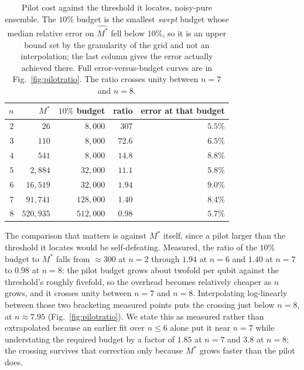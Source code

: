 \begin{table}[htbp]
\centering
\setlength{\tabcolsep}{9pt}
\begin{tabular}{@{}rrrrr@{}}
\toprule
\(n\) & \(M^*\) & \(10\%\) budget & ratio & error at that budget \\
\midrule
\(2\) & \(26\)        & \(8{,}000\)   & \(307\)   & \(5.5\%\) \\
\(3\) & \(110\)       & \(8{,}000\)   & \(72.6\)  & \(6.5\%\) \\
\(4\) & \(541\)       & \(8{,}000\)   & \(14.8\)  & \(8.8\%\) \\
\(5\) & \(2{,}884\)   & \(32{,}000\)  & \(11.1\)  & \(5.8\%\) \\
\(6\) & \(16{,}519\)  & \(32{,}000\)  & \(1.94\)  & \(9.0\%\) \\
\(7\) & \(91{,}741\)  & \(128{,}000\) & \(1.40\)  & \(8.4\%\) \\
\(8\) & \(520{,}935\) & \(512{,}000\) & \(0.98\)  & \(5.7\%\) \\
\bottomrule
\end{tabular}
\caption{Pilot cost against the threshold it locates, noisy-pure ensemble. The \(10\%\) budget is the smallest \emph{swept} budget whose median relative error on \(\widehat{M^*}\) fell below \(10\%\), so it is an upper bound set by the granularity of the grid and not an interpolation; the last column gives the error actually achieved there. Full error-versus-budget curves are in Fig.~\ref{fig:pilotratio}. The ratio crosses unity between \(n = 7\) and \(n = 8\).}
\label{tab:pilot}
\end{table}

The comparison that matters is against \(M^*\) itself, since a pilot larger than the threshold it
locates would be self-defeating. Measured, the ratio of the \(10\%\) budget to \(M^*\) falls from
\(\approx\!300\) at \(n = 2\) through \(1.94\) at \(n = 6\) and \(1.40\) at \(n = 7\) to
\(0.98\) at \(n = 8\): the pilot budget grows about twofold per qubit against the threshold's
roughly fivefold, so the overhead becomes relatively cheaper as \(n\) grows, and it crosses unity
between \(n = 7\) and \(n = 8\). Interpolating log-linearly between those two bracketing measured
points puts the crossing just below \(n = 8\), at \(n \approx 7.95\)
(Fig.~\ref{fig:pilotratio}). We state this as
measured rather than extrapolated because an earlier fit over \(n \le 6\) alone put it near
\(n = 7\) while understating the required budget by a factor of \(1.85\) at \(n = 7\) and
\(3.8\) at \(n = 8\); the crossing survives that correction only because \(M^*\) grows
faster than the pilot does.

